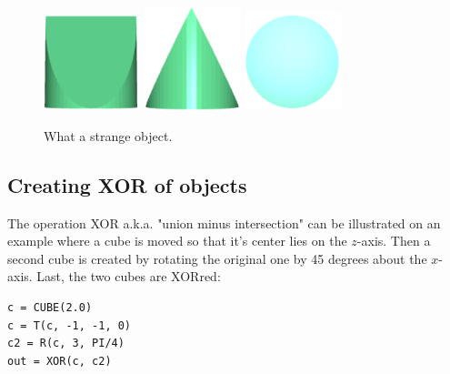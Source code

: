 \begin{figure}[!ht]
\begin{center}
\includegraphics[width=0.25\textwidth]{img/int-1a.png}
\includegraphics[width=0.25\textwidth]{img/int-1b.png}
\includegraphics[width=0.25\textwidth]{img/int-1c.png}
\end{center}
\vspace{-4mm}
\caption{What a strange object.}
\label{fig:int-1}
\end{figure}


\subsection{Creating XOR of objects}\label{subsec:xor}

The operation XOR a.k.a. "union minus intersection" can be illustrated  
on an example where a cube is moved so that it's center lies on the $z$-axis. Then 
a second cube is created by rotating the original one by 45 degrees about the 
$x$-axis. Last, the two cubes are XORred:\\
 
\begin{bbox}
\begin{verbatim}
c = CUBE(2.0)
c = T(c, -1, -1, 0)
c2 = R(c, 3, PI/4)
out = XOR(c, c2) 
\end{verbatim}
\end{bbox}
\vspace{6mm}

